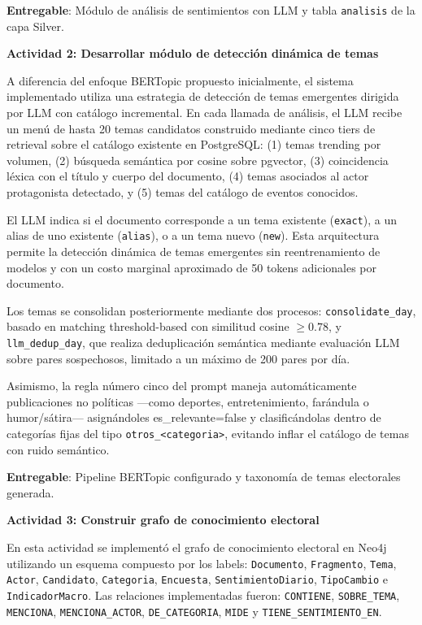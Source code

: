 \documentclass[listof=nochaptergap,12pt,times,authoryear]{report}
\begin{document}
\textbf{Entregable}: Módulo de análisis de sentimientos con LLM y tabla \texttt{analisis} de la capa Silver.
 
\textbf{Actividad 2: Desarrollar módulo de detección dinámica de temas}
 
A diferencia del enfoque BERTopic propuesto inicialmente, el sistema implementado utiliza una estrategia de detección de temas emergentes dirigida por LLM con catálogo incremental. En cada llamada de análisis, el LLM recibe un menú de hasta 20 temas candidatos construido mediante cinco tiers de retrieval sobre el catálogo existente en PostgreSQL: (1) temas trending por volumen, (2) búsqueda semántica por cosine sobre pgvector, (3) coincidencia léxica con el título y cuerpo del documento, (4) temas asociados al actor protagonista detectado, y (5) temas del catálogo de eventos conocidos.

El LLM indica si el documento corresponde a un tema existente (\texttt{exact}), a un alias de uno existente (\texttt{alias}), o a un tema nuevo (\texttt{new}). Esta arquitectura permite la detección dinámica de temas emergentes sin reentrenamiento de modelos y con un costo marginal aproximado de 50 tokens adicionales por documento.

Los temas se consolidan posteriormente mediante dos procesos: \texttt{consolidate\_day}, basado en matching threshold-based con similitud cosine $\geq 0.78$, y \texttt{llm\_dedup\_day}, que realiza deduplicación semántica mediante evaluación LLM sobre pares sospechosos, limitado a un máximo de 200 pares por día.

Asimismo, la regla número cinco del prompt maneja automáticamente publicaciones no políticas —como deportes, entretenimiento, farándula o humor/sátira— asignándoles es\_relevante=false y clasificándolas dentro de categorías fijas del tipo \texttt{otros\_<categoria>}, evitando inflar el catálogo de temas con ruido semántico.
 
\textbf{Entregable}: Pipeline BERTopic configurado y taxonomía de temas electorales generada.
 
\textbf{Actividad 3: Construir grafo de conocimiento electoral}
 
En esta actividad se implementó el grafo de conocimiento electoral en Neo4j utilizando un esquema compuesto por los labels: \texttt{Documento}, \texttt{Fragmento}, \texttt{Tema}, \texttt{Actor}, \texttt{Candidato}, \texttt{Categoria}, \texttt{Encuesta}, \texttt{SentimientoDiario}, \texttt{TipoCambio} e \texttt{IndicadorMacro}. Las relaciones implementadas fueron: \texttt{CONTIENE}, \texttt{SOBRE\_TEMA}, \texttt{MENCIONA}, \texttt{MENCIONA\_ACTOR}, \texttt{DE\_CATEGORIA}, \texttt{MIDE} y \texttt{TIENE\_SENTIMIENTO\_EN}.
\end{document}
